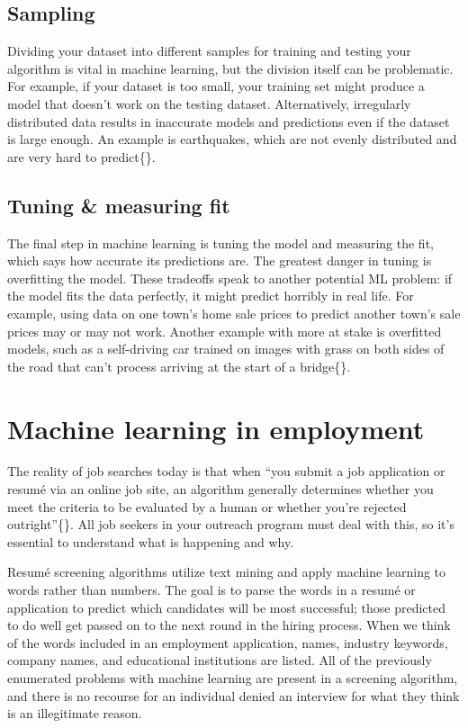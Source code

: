 \documentclass[
  krantz2]{krantz}
\begin{document}
\hypertarget{sampling}{%
\subsection{Sampling}\label{sampling}}

Dividing your dataset into different samples for training and testing your algorithm is vital in machine learning, but the division itself can be problematic. For example, if your dataset is too small, your training set might produce a model that doesn't work on the testing dataset. Alternatively, irregularly distributed data results in inaccurate models and predictions even if the dataset is large enough. An example is earthquakes, which are not evenly distributed and are very hard to predict\{\citet{silver2012}\}.

\hypertarget{tuning-measuring-fit}{%
\subsection{Tuning \& measuring fit}\label{tuning-measuring-fit}}

The final step in machine learning is tuning the model and measuring the fit, which says how accurate its predictions are. The greatest danger in tuning is overfitting the model. These tradeoffs speak to another potential ML problem: if the model fits the data perfectly, it might predict horribly in real life. For example, using data on one town's home sale prices to predict another town's sale prices may or may not work. Another example with more at stake is overfitted models, such as a self-driving car trained on images with grass on both sides of the road that can't process arriving at the start of a bridge\{\citet{shane2019}\}.

\hypertarget{machine-learning-in-employment}{%
\section{Machine learning in employment}\label{machine-learning-in-employment}}

The reality of job searches today is that when ``you submit a job application or resumé via an online job site, an algorithm generally determines whether you meet the criteria to be evaluated by a human or whether you're rejected outright''\{\citet{broussard2018}\}. All job seekers in your outreach program must deal with this, so it's essential to understand what is happening and why.

Resumé screening algorithms utilize text mining and apply machine learning to words rather than numbers. The goal is to parse the words in a resumé or application to predict which candidates will be most successful; those predicted to do well get passed on to the next round in the hiring process. When we think of the words included in an employment application, names, industry keywords, company names, and educational institutions are listed. All of the previously enumerated problems with machine learning are present in a screening algorithm, and there is no recourse for an individual denied an interview for what they think is an illegitimate reason.
\end{document}
